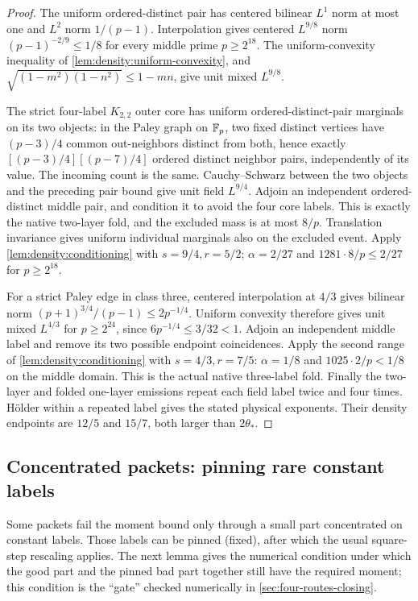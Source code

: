\begin{proof}
The uniform ordered-distinct pair has centered bilinear $L^1$ norm
at most one and $L^2$ norm $1/(p-1)$. Interpolation gives centered $L^{9/8}$ norm $(p-1)^{-2/9}\le1/8$ for every middle prime $p\ge2^{18}$.
The uniform-convexity inequality of
\cref{lem:density:uniform-convexity}, and
$\sqrt{(1-m^2)(1-n^2)}\le1-mn$, give unit mixed $L^{9/8}$.

The strict four-label $K_{2,2}$ outer core has uniform
ordered-distinct-pair marginals on its two objects: in the Paley graph on $\mathbb F_p$, two fixed distinct vertices have $(p-3)/4$ common out-neighbors distinct from both, hence exactly
$[(p-3)/4][(p-7)/4]$ ordered distinct neighbor pairs, independently
of its value. The incoming count is the same. Cauchy--Schwarz between
the two objects and the preceding pair bound give unit field $L^{9/4}$.
Adjoin an independent ordered-distinct middle pair, and condition it
to avoid the four core labels. This is exactly the native two-layer
fold, and the excluded mass is at most $8/p$. Translation invariance
gives uniform individual marginals also on the excluded event.
Apply \cref{lem:density:conditioning} with $s=9/4,r=5/2$;
$\alpha=2/27$ and $1281\cdot8/p\le2/27$ for $p\ge2^{18}$.

For a strict Paley edge in class three, centered interpolation at
$4/3$ gives bilinear norm
$(p+1)^{3/4}/(p-1)\le2p^{-1/4}$.
Uniform convexity therefore gives unit mixed $L^{4/3}$ for $p\ge2^{24}$,
since $6p^{-1/4}\le3/32<1$.
Adjoin an independent middle label and remove its two possible
endpoint coincidences. Apply the second range of
\cref{lem:density:conditioning} with $s=4/3,r=7/5$:
$\alpha=1/8$ and $1025\cdot2/p<1/8$ on the middle domain.
This is the actual native three-label fold.
Finally the two-layer and folded one-layer emissions repeat each
field label twice and four times. H\"older within a repeated label
gives the stated physical exponents. Their density endpoints are
$12/5$ and $15/7$, both larger than $2\theta_*$.
\end{proof}

\subsection{Concentrated packets: pinning rare constant labels}

Some packets fail the moment bound only through a small part
concentrated on constant labels. Those labels can be pinned
(fixed), after which the usual square-step rescaling applies. The
next lemma gives the numerical condition under which the good
part and the pinned bad part together still have the required
moment; this condition is the ``gate'' checked numerically in
\cref{sec:four-routes-closing}.

